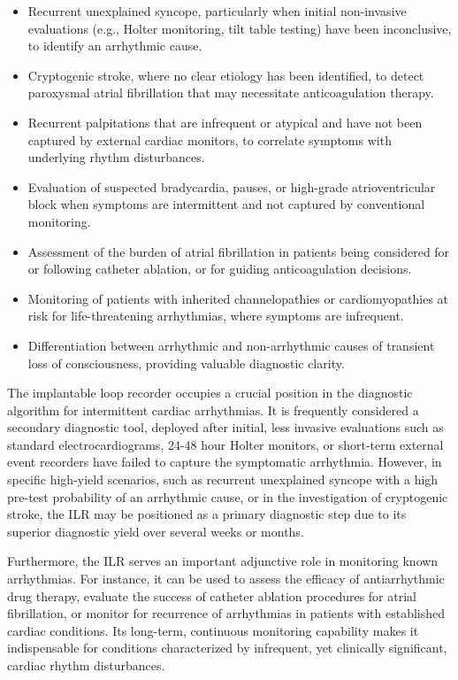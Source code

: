 \begin{itemize}
  \item Recurrent unexplained syncope, particularly when initial non-invasive evaluations (e.g., Holter monitoring, tilt table testing) have been inconclusive, to identify an arrhythmic cause.
  \item Cryptogenic stroke, where no clear etiology has been identified, to detect paroxysmal atrial fibrillation that may necessitate anticoagulation therapy.
  \item Recurrent palpitations that are infrequent or atypical and have not been captured by external cardiac monitors, to correlate symptoms with underlying rhythm disturbances.
  \item Evaluation of suspected bradycardia, pauses, or high-grade atrioventricular block when symptoms are intermittent and not captured by conventional monitoring.
  \item Assessment of the burden of atrial fibrillation in patients being considered for or following catheter ablation, or for guiding anticoagulation decisions.
  \item Monitoring of patients with inherited channelopathies or cardiomyopathies at risk for life-threatening arrhythmias, where symptoms are infrequent.
  \item Differentiation between arrhythmic and non-arrhythmic causes of transient loss of consciousness, providing valuable diagnostic clarity.
\end{itemize}

The implantable loop recorder occupies a crucial position in the diagnostic algorithm for intermittent cardiac arrhythmias. It is frequently considered a secondary diagnostic tool, deployed after initial, less invasive evaluations such as standard electrocardiograms, 24-48 hour Holter monitors, or short-term external event recorders have failed to capture the symptomatic arrhythmia. However, in specific high-yield scenarios, such as recurrent unexplained syncope with a high pre-test probability of an arrhythmic cause, or in the investigation of cryptogenic stroke, the ILR may be positioned as a primary diagnostic step due to its superior diagnostic yield over several weeks or months.

Furthermore, the ILR serves an important adjunctive role in monitoring known arrhythmias. For instance, it can be used to assess the efficacy of antiarrhythmic drug therapy, evaluate the success of catheter ablation procedures for atrial fibrillation, or monitor for recurrence of arrhythmias in patients with established cardiac conditions. Its long-term, continuous monitoring capability makes it indispensable for conditions characterized by infrequent, yet clinically significant, cardiac rhythm disturbances.

